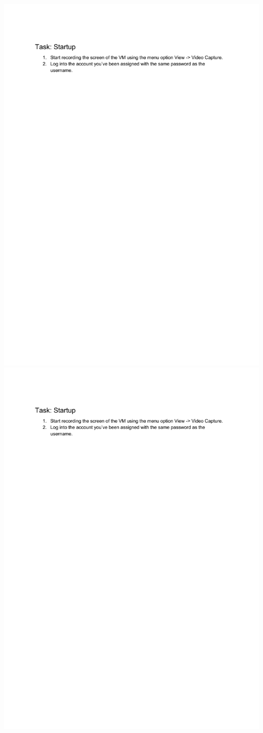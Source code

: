 \begin{adjustwidth}[]{0cm}{0cm}
\includegraphics[width=.5\textwidth,page=3,frame]{include/backmatter/tasks.pdf}
\includegraphics[width=.5\textwidth,page=4,frame]{include/backmatter/tasks.pdf}
\end{adjustwidth}
\vfill
